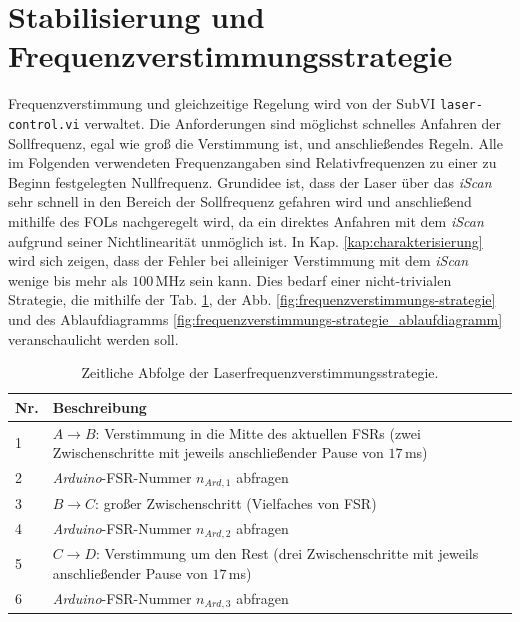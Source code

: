 \section{Stabilisierung
und
Frequenzverstimmungsstrategie}\label{sec:stabilisierung_frequenzverstimmungs-strategie}
Frequenzverstimmung und gleichzeitige Regelung wird von der SubVI \lstinline|laser-control.vi| verwaltet. Die Anforderungen sind möglichst schnelles Anfahren der Sollfrequenz, egal wie groß die Verstimmung ist, und
anschließendes Regeln. Alle im Folgenden verwendeten Frequenzangaben sind
Relativfrequenzen zu einer zu Beginn festgelegten Nullfrequenz. Grundidee ist,
dass der Laser über das \textit{iScan} sehr schnell in den Bereich der
Sollfrequenz gefahren wird und anschließend mithilfe des FOLs nachgeregelt wird,
da ein direktes Anfahren mit dem \textit{iScan} aufgrund seiner Nichtlinearität unmöglich ist. In Kap. \ref{kap:charakterisierung} wird sich zeigen, dass der Fehler bei
alleiniger Verstimmung mit dem \textit{iScan} wenige bis mehr als $100\,$MHz sein kann.
Dies bedarf einer nicht-trivialen Strategie, die mithilfe der Tab.
\ref{tab:scan-strategie_abfolge}, der Abb.
\ref{fig:frequenzverstimmungs-strategie} und des Ablaufdiagramms
\ref{fig:frequenzverstimmungs-strategie_ablaufdiagramm} veranschaulicht werden
soll.\par
\begin{table}
	\begin{tabular}{p{}p{}}
		\toprule
			Nr. & Beschreibung \\
		\midrule[1px]
		\hline
			1 & $A\rightarrow B$: Verstimmung in die Mitte des aktuellen FSRs (zwei
			Zwischenschritte mit jeweils anschließender Pause von $17\,$ms)\\
			2 & \textit{Arduino}-FSR-Nummer $n_{Ard,1}$ abfragen\\
			3 & $B\rightarrow C$: großer Zwischenschritt (Vielfaches von FSR)\\
			4 & \textit{Arduino}-FSR-Nummer $n_{Ard,2}$ abfragen\\
			5 & $C\rightarrow D$: Verstimmung um den Rest (drei Zwischenschritte mit
			jeweils anschließender Pause von $17\,$ms)\\
			6 & \textit{Arduino}-FSR-Nummer $n_{Ard,3}$ abfragen\\
		\bottomrule[1px]
	\end{tabular}
	\caption[Laserfrequenzverstimmungs-Strategie]{Zeitliche
	Abfolge der Laserfrequenzverstimmungsstrategie.}
	\label{tab:scan-strategie_abfolge}
\end{table}
